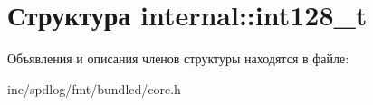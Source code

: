 \hypertarget{structinternal_1_1int128__t}{}\section{Структура internal\+:\+:int128\+\_\+t}
\label{structinternal_1_1int128__t}


Объявления и описания членов структуры находятся в файле\+:\begin{DoxyCompactItemize}
\item 
inc/spdlog/fmt/bundled/core.\+h\end{DoxyCompactItemize}
